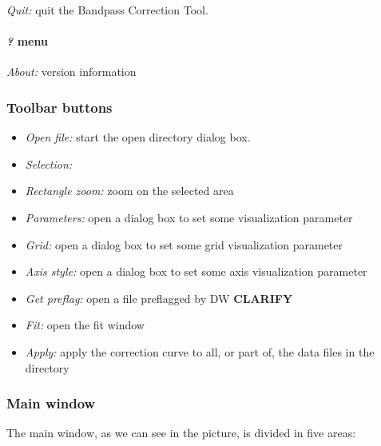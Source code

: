 \documentclass[letterpaper,10pt,english]{sphinxmanual}
\begin{document}
\emph{Quit:} quit the Bandpass Correction Tool.


\paragraph{\emph{?} menu}
\label{guibp:id1}
\emph{About:}  version information


\subsubsection{Toolbar buttons}
\label{guibp:toolbar-buttons}\begin{itemize}
\item {} 
\emph{Open file:} start the open directory dialog box.

\item {} 
\emph{Selection:}

\item {} 
\emph{Rectangle zoom:} zoom on the selected area

\item {} 
\emph{Parameters:} open a dialog box to set some visualization parameter

\item {} 
\emph{Grid:} open a dialog box to set some grid visualization parameter

\item {} 
\emph{Axis style:} open a dialog box to set some axis visualization parameter

\item {} 
\emph{Get preflag:} open a file preflagged by DW \textbf{CLARIFY}

\item {} 
\emph{Fit:} open the fit window

\item {} 
\emph{Apply:} apply the correction curve to all, or part of, the data files in the directory

\end{itemize}


\subsubsection{Main window}
\label{guibp:main-window}

The main window, as we can see in the picture, is divided in five areas:
\end{document}
